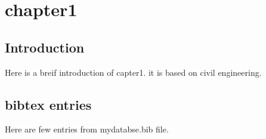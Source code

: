 \chapter{chapter1}
\section{Introduction}
Here is a breif introduction of capter1. it is based on civil
engineering.
\section{bibtex entries}
Here are few entries from mydatabse.bib file.


